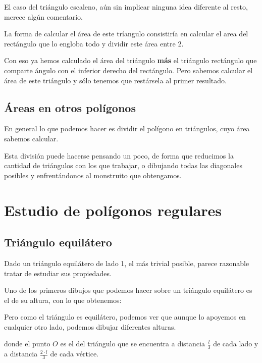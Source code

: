 \documentclass{apuntes}
\begin{document}
El caso del triángulo escaleno, aún sin implicar ninguna idea diferente al resto, merece algún comentario.

La forma de calcular el área de este tríangulo consistiría en calcular el area del rectángulo que lo engloba todo y dividir este área entre 2.

Con eso ya hemos calculado el área del triángulo \textbf{más} el triángulo rectángulo que comparte ángulo con el inferior derecho del rectángulo. Pero sabemos calcular el área de este triángulo y sólo tenemos que restársela al primer resultado.

\subsection{Áreas en otros polígonos}
En general lo que podemos hacer es dividir el polígono en triángulos, cuyo área sabemos calcular. 

Esta división puede hacerse pensando un poco, de forma que reducimos la cantidad de triángulos con los que trabajar, o dibujando todas las diagonales posibles y enfrentándonos al monstruito que obtengamos.

\section{Estudio de polígonos regulares}
\subsection{Triángulo equilátero}
Dado un triángulo equilátero de lado 1, el más trivial posible, parece razonable tratar de estudiar sus propiedades.

Uno de los primeros dibujos que podemos hacer sobre un triángulo equilátero es el de su altura, con lo que obtenemos:
\begin{center}
\end{center}

Pero como el triángulo es equilátero, podemos ver que aunque lo apoyemos en cualquier otro lado, podemos dibujar diferentes alturas.

\begin{center}
\end{center}

donde el punto $O$ es el  del triángulo que se encuentra a distancia $\frac{l}{3}$ de cada lado y a distancia $\frac{2\cdot l}{3}$ de cada vértice.
\end{document}
